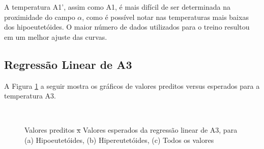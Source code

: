 \documentclass[brazil,tf,epusp]{usp}  %
\providecommand{\DIFadd}[1]{{\protect\color{blue}\uwave{#1}}} %
\providecommand{\DIFdel}[1]{{\protect\color{red}\sout{#1}}}                      %
\providecommand{\DIFaddFL}[1]{\DIFadd{#1}} %
\providecommand{\DIFdelFL}[1]{\DIFdel{#1}} %
\providecommand{\DIFaddbeginFL}{} %
\providecommand{\DIFaddendFL}{} %
\providecommand{\DIFdelbeginFL}{} %
\providecommand{\DIFdelendFL}{} %
\begin{document}
A temperatura A1', assim como A1, é mais difícil de ser determinada na proximidade do campo $\alpha$, como é possível notar nas temperaturas mais baixas dos hipoeutetóides. O maior número de dados utilizados para o treino resultou em um melhor ajuste das curvas.

\subsection{Regressão Linear de A3}

A Figura \ref{fig:LR_A3} a seguir mostra os gráficos de valores preditos versus esperados para a temperatura A3.

\begin{figure}[!h]
\hfill
{}\\
\caption{Valores preditos \DIFdelbeginFL \DIFdelFL{x }\DIFdelendFL \DIFaddbeginFL \DIFaddFL{vs. }\DIFaddendFL Valores esperados da regressão linear de A3, para (a) Hipoeutetóides, (b) Hipereutetóides, (c) Todos os valores}
\label{fig:LR_A3}
\end{figure}
\end{document}
